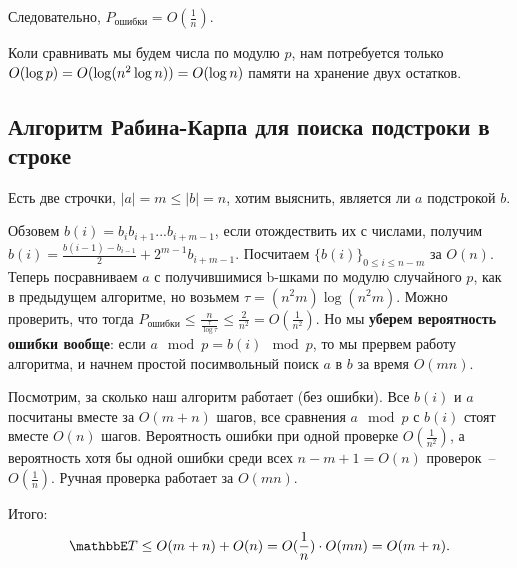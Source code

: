 Следовательно, $P_\text{ошибки} = O(\frac{1}{n})$.

Коли сравнивать мы будем числа по модулю $p$, нам потребуется только $O(\log p) = \\ O(\log(n^2\log n)) = O(\log n)$ памяти на хранение двух остатков.

\subsection{Алгоритм Рабина-Карпа для поиска подстроки в строке}

Есть две строчки, $|a|=m\le|b|=n$, хотим выяснить, является ли $a$ подстрокой $b$.

Обзовем $b(i)=b_i b_{i+1}...b_{i+m-1}$, если отождествить их с числами, получим $b(i)=\frac{b(i-1)-b_{i-1}}{2}+2^{m-1} b_{i+m-1}$. Посчитаем $\{b(i)\}_{0\le i\le n-m}$ за $O(n)$. Теперь посравниваем $a$ с получившимися b-шками по модулю случайного $p$, как в предыдущем алгоритме, но возьмем $\tau=(n^2m)\log(n^2m)$. Можно проверить, что тогда $P_{\text{ошибки}}\le\frac{n}{\frac{\tau}{\log\tau}}\le\frac{2}{n^2}=O(\frac{1}{n^2})$. Но мы \textbf{уберем вероятность ошибки вообще}: если $a\mod{p}=b(i)\mod{p}$, то мы прервем работу алгоритма, и начнем простой посимвольный поиск $a$ в $b$ за время $O(mn)$.

Посмотрим, за сколько наш алгоритм работает (без ошибки). Все $b(i)$ и $a$ посчитаны вместе за $O(m+n)$ шагов, все сравнения $a \mod{p}$ с $b(i)$ стоят вместе $O(n)$ шагов. Вероятность ошибки при одной проверке $O(\frac{1}{n^2})$, а вероятность хотя бы одной ошибки среди всех $n-m+1 = O(n)$ проверок~-- $O(\frac{1}{n})$. Ручная проверка работает за $O(mn)$. 

Итого: $$\mathbbE T\le O(m+n) + O(n) = O(\frac{1}{n})\cdot O(mn) = O(m+n).$$
